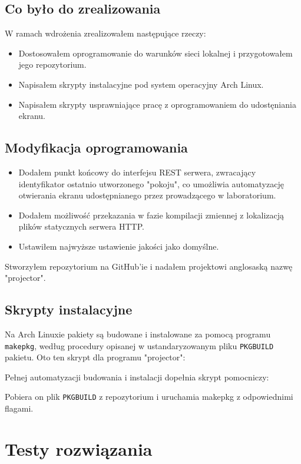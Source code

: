 \documentclass[a4paper,11pt]{article}
\begin{document}
        \subsection{Co było do zrealizowania}
        W ramach wdrożenia zrealizowałem następujące rzeczy: 
        \begin{itemize}
            \item Dostosowałem oprogramowanie do warunków sieci lokalnej i przygotowałem jego repozytorium.
            \item Napisałem skrypty instalacyjne pod system operacyjny Arch Linux.
            \item Napisałem skrypty usprawniające pracę z oprogramowaniem do udostęniania ekranu.
        \end{itemize}
        \subsection{Modyfikacja oprogramowania}
        \begin{itemize}
            \item Dodałem punkt końcowy do interfejsu REST serwera, zwracający identyfikator ostatnio utworzonego "pokoju", co umożliwia automatyzację otwierania ekranu udostępnianego przez prowadzącego w laboratorium.  
            \item Dodałem możliwość przekazania w fazie kompilacji zmiennej z lokalizacją plików statycznych serwera HTTP.
            \item Ustawiłem najwyższe ustawienie jakości jako domyślne. 
        \end{itemize}
        Stworzyłem repozytorium na GitHub'ie i nadałem projektowi anglosaską nazwę "projector".
        \subsection{Skrypty instalacyjne}
        Na Arch Linuxie pakiety są budowane i instalowane za pomocą programu \texttt{makepkg}, według procedury opisanej w ustandaryzowanym pliku \texttt{PKGBUILD} pakietu. 
        Oto ten skrypt dla programu "projector":
        
        Pełnej automatyzacji budowania i instalacji dopełnia skrypt pomocniczy:
        
        Pobiera on plik \texttt{PKGBUILD} z repozytorium i uruchamia makepkg z odpowiednimi flagami. 
    \section{Testy rozwiązania}
\end{document}
